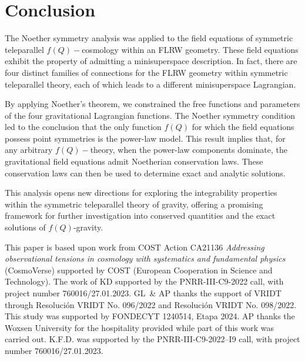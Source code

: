 \documentclass[onecolumn,superscriptaddress,secnumarabic,nobibnotes,aps,prd,nofootinbib,altaffilletter,11pt]{revtex4}
\begin{document}
\section{Conclusion}

\label{sec6}
The Noether symmetry analysis was applied to the field equations of symmetric teleparallel $f(Q)-$cosmology within an FLRW geometry. These field equations exhibit the property of admitting a minisuperspace description. In fact, there are four distinct families of connections for the FLRW geometry within symmetric teleparallel theory, each of which leads to a different minisuperspace Lagrangian.

By applying Noether's theorem, we constrained the free functions and parameters of the four gravitational Lagrangian functions. The Noether symmetry condition led to the conclusion that the only function $f(Q)$ for which the field equations possess point symmetries is the power-law model. This result implies that, for any arbitrary $f(Q)-$theory, when the power-law components dominate, the gravitational field equations admit Noetherian conservation laws. These conservation laws can then be used to determine exact and analytic solutions.

This analysis opens new directions for exploring the integrability properties within the symmetric teleparallel theory of gravity, offering a promising framework for further investigation into conserved quantities and the exact solutions of $f(Q)$-gravity.

\begin{acknowledgments}
This paper is based upon work from COST Action CA21136 \textit{Addressing
observational tensions in cosmology with systematics and fundamental physics}
(CosmoVerse) supported by COST (European Cooperation in Science and
Technology). The work of KD supported by the PNRR-III-C9-2022 call, with
project number 760016/27.01.2023. GL\ \& AP thanks the support of VRIDT
through Resoluci\'{o}n VRIDT No. 096/2022 and Resoluci\'{o}n VRIDT No.
098/2022. This study was supported by FONDECYT 1240514, Etapa 2024. AP
thanks the Woxsen University for the hospitality provided while part of this
work was carried out. K.F.D. was supported by the PNRR-III-C9-2022–I9 call, with project number 760016/27.01.2023.
\end{acknowledgments}

\end{document}
